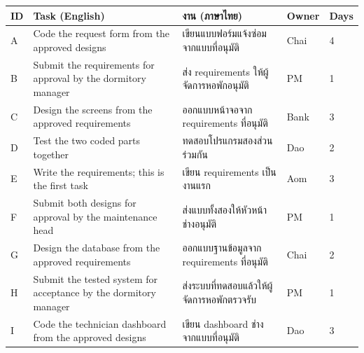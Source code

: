 \begingroup\fontsize{9.5}{12.5}\selectfont
\renewcommand{\tabularxcolumn}[1]{m{#1}}
\begin{tabularx}{\linewidth}{|M{.5cm}|P|P|M{1.05cm}|M{.7cm}|}\hline
ID & Task (English) & งาน (ภาษาไทย) & Owner & Days\\\hline
A & Code the request form from the approved designs & เขียนแบบฟอร์มแจ้งซ่อมจากแบบที่อนุมัติ & Chai & 4\\\hline
B & Submit the requirements for approval by the dormitory manager & ส่ง requirements ให้ผู้จัดการหอพักอนุมัติ & PM & 1\\\hline
C & Design the screens from the approved requirements & ออกแบบหน้าจอจาก requirements ที่อนุมัติ & Bank & 3\\\hline
D & Test the two coded parts together & ทดสอบโปรแกรมสองส่วนร่วมกัน & Dao & 2\\\hline
E & Write the requirements; this is the first task & เขียน requirements เป็นงานแรก & Aom & 3\\\hline
F & Submit both designs for approval by the maintenance head & ส่งแบบทั้งสองให้หัวหน้าช่างอนุมัติ & PM & 1\\\hline
G & Design the database from the approved requirements & ออกแบบฐานข้อมูลจาก requirements ที่อนุมัติ & Chai & 2\\\hline
H & Submit the tested system for acceptance by the dormitory manager & ส่งระบบที่ทดสอบแล้วให้ผู้จัดการหอพักตรวจรับ & PM & 1\\\hline
I & Code the technician dashboard from the approved designs & เขียน dashboard ช่างจากแบบที่อนุมัติ & Dao & 3\\\hline
\end{tabularx}\endgroup

